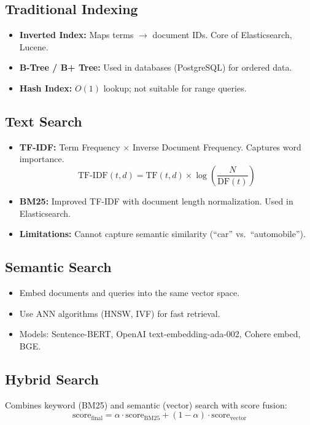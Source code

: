 \documentclass[11pt,a4paper]{article}
\begin{document}
\subsection{Traditional Indexing}
\begin{itemize}[nosep]
  \item \textbf{Inverted Index:} Maps terms $\rightarrow$ document IDs. Core of Elasticsearch, Lucene.
  \item \textbf{B-Tree / B+ Tree:} Used in databases (PostgreSQL) for ordered data.
  \item \textbf{Hash Index:} $O(1)$ lookup; not suitable for range queries.
\end{itemize}

\subsection{Text Search}
\begin{itemize}[nosep]
  \item \textbf{TF-IDF:} Term Frequency $\times$ Inverse Document Frequency. Captures word importance.
  \[
    \text{TF-IDF}(t,d) = \text{TF}(t,d) \times \log\!\left(\frac{N}{\text{DF}(t)}\right)
  \]
  \item \textbf{BM25:} Improved TF-IDF with document length normalization. Used in Elasticsearch.
  \item \textbf{Limitations:} Cannot capture semantic similarity (``car'' vs.\ ``automobile'').
\end{itemize}

\subsection{Semantic Search}
\begin{itemize}[nosep]
  \item Embed documents and queries into the same vector space.
  \item Use ANN algorithms (HNSW, IVF) for fast retrieval.
  \item Models: Sentence-BERT, OpenAI text-embedding-ada-002, Cohere embed, BGE.
\end{itemize}

\subsection{Hybrid Search}
Combines keyword (BM25) and semantic (vector) search with score fusion:
\[
  \text{score}_{\text{final}} = \alpha \cdot \text{score}_{\text{BM25}} + (1-\alpha) \cdot \text{score}_{\text{vector}}
\]
\end{document}
